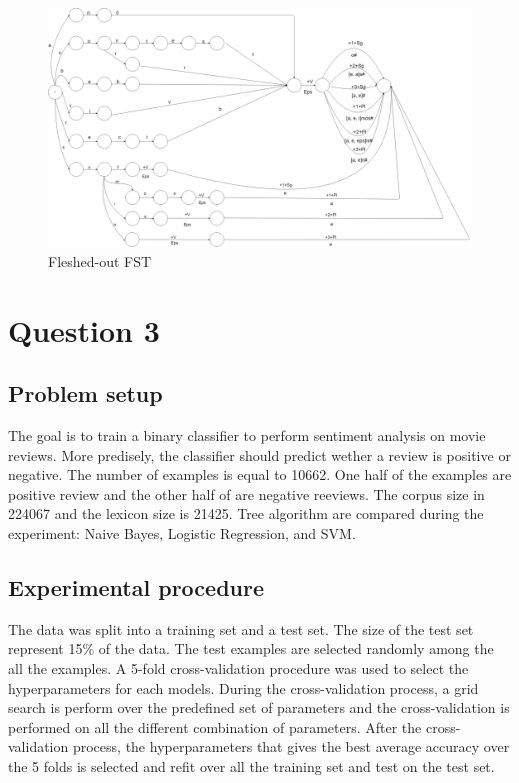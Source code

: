 \documentclass[10pt]{article}
\begin{document}
\begin{figure}[h!]
    \centering
    \includegraphics[scale=0.2]{fleshed-out_fst.png}
    \caption{Fleshed-out FST}
    \label{fig:fleshed-out_fst}
\end{figure}

\newpage

\section*{Question 3}

\subsection*{Problem setup}
The goal is to train a binary classifier to perform sentiment analysis on movie reviews. More predisely, the classifier should predict wether a review is positive or negative. The number of examples is equal to 10662. One half of the examples are positive review and the other half of are negative reeviews. The corpus size in 224067 and the lexicon size is 21425. Tree algorithm are compared during the experiment: Naive Bayes, Logistic Regression, and SVM.

\subsection*{Experimental procedure}
The data was split into a training set and a test set. The size of the test set represent 15\% of the data. The test examples are selected randomly among the all the examples. A 5-fold cross-validation procedure was used to select the hyperparameters for each models. During the cross-validation process, a grid search is perform over the predefined set of parameters and the cross-validation is performed on all the different combination of parameters. After the cross-validation process, the hyperparameters that gives the best average accuracy over the 5 folds is selected and refit over all the training set and test on the test set.
\end{document}

